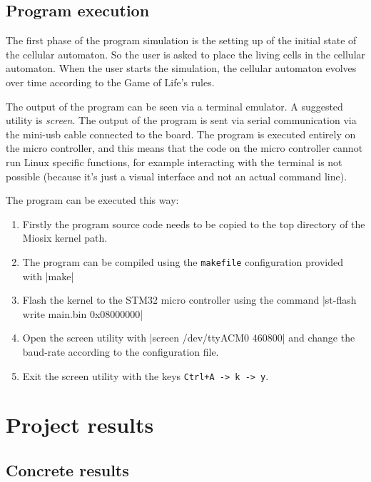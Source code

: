 \documentclass[10pt]{article}
\begin{document}
    \subsection{Program execution}

    The first phase of the program simulation is the setting up of the initial state of the cellular automaton. So the user is asked to place the living cells in the
    cellular automaton. When the user starts the simulation, the cellular automaton evolves over time according to the Game of Life's rules.

    The output of the program can be seen via a terminal emulator. A suggested utility is \textit{screen}. The output of the program is sent via serial communication
    via the mini-usb cable connected to the board. The program is executed entirely on the micro controller, and this means that the code on the micro controller
    cannot run Linux specific functions, for example interacting with the terminal is not possible (because it's just a visual interface and not an actual command line).

    The program can be executed this way:
    \begin{enumerate}
        \item Firstly the program source code needs to be copied to the top directory of the Miosix kernel path.
        \item The program can be compiled using the \verb|makefile| configuration provided with |make|
        \item Flash the kernel to the STM32 micro controller using the command |st-flash write main.bin 0x08000000|
        \item Open the screen utility with
        |screen /dev/ttyACM0 460800|
        \noindent and change the baud-rate according to the configuration file.
        \item Exit the screen utility with the keys \verb|Ctrl+A -> k -> y|.
    \end{enumerate}

    \newpage

    \section{Project results }

    \subsection{Concrete results}
\end{document}
